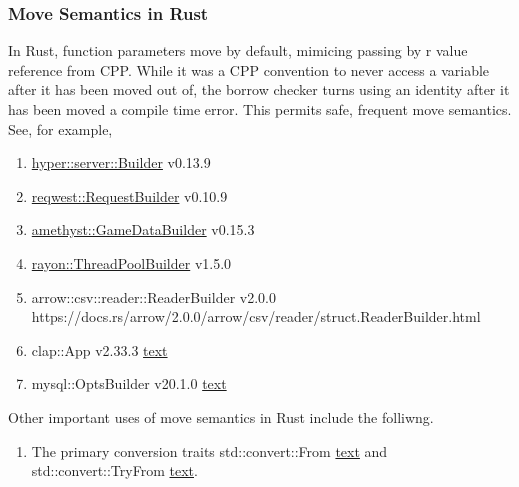 \documentclass[8pt]{beamer}
\theoremstyle{remark}
\begin{document}
    \begin{frame}
            \frametitle{Move Semantics in Rust}
            In Rust, function parameters move by default, mimicing passing by r
            value reference from CPP. While it was a CPP convention to never
            access a variable after it has been moved out of, the borrow
            checker turns using an identity after it has been moved a compile
            time error. This permits safe, frequent move semantics. See, for
            example, 
            \begin{enumerate}
                \item \href{https://docs.rs/hyper/0.13.9/hyper/server/struct.Builder.html}{hyper::server::Builder} v0.13.9
                \item \href{https://docs.rs/reqwest/0.10.9/reqwest/struct.RequestBuilder.html}{reqwest::RequestBuilder} v0.10.9                
                \item \href{https://docs.amethyst.rs/stable/amethyst/struct.GameDataBuilder.html}{amethyst::GameDataBuilder} v0.15.3
                \item \href{https://docs.rs/rayon/1.5.0/rayon/struct.ThreadPoolBuilder.html}{rayon::ThreadPoolBuilder} v1.5.0
                \item arrow::csv::reader::ReaderBuilder v2.0.0
                https://docs.rs/arrow/2.0.0/arrow/csv/reader/struct.ReaderBuilder.html
                \item clap::App v2.33.3
                \href{https://docs.rs/clap/2.33.3/clap/struct.App.html}{text}
                \item mysql::OptsBuilder v20.1.0
                \href{https://docs.rs/mysql/20.1.0/mysql/struct.OptsBuilder.html}{text}
            \end{enumerate} 

            Other important uses of move semantics in Rust include the folliwng.

            \begin{enumerate}
                \item The primary conversion traits std::convert::From \href{https://doc.rust-lang.org/std/convert/trait.From.html\#tymethod.from}{text} and std::convert::TryFrom \href{https://doc.rust-lang.org/std/convert/trait.TryFrom.html\#tymethod.try_from}{text}. 
            \end{enumerate}
    \end{frame}
\end{document}
